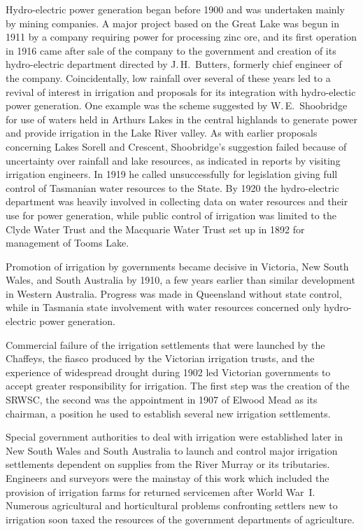 Hydro-electric power generation began before 1900 and was undertaken
mainly by mining companies.  A major project based on the Great Lake
 was begun in 1911 by a company requiring power for
processing zinc ore, and its first operation in 1916 came after sale
of the company to the government and creation of its hydro-electric
department directed by J.\,H.~Butters,  formerly
chief engineer of the company.  Coincidentally, low rainfall over
several of these years led to a revival of interest in irrigation and
proposals for its integration with hydro-electic power generation.
One example was the scheme suggested by W.\,E.~Shoobridge
 for use of
waters held in Arthurs Lakes  in the central
highlands to generate power and provide irrigation in the Lake River
valley.  As with earlier proposals concerning Lakes Sorell and
Crescent, Shoobridge's suggestion failed because of uncertainty over
rainfall and lake resources, as indicated in reports by visiting
irrigation engineers. In 1919 he called unsuccessfully for legislation
giving full control of Tasmanian water resources to the State.  By
1920 the hydro-electric department was heavily involved in collecting
data on water resources and their use for power generation, while
public control of irrigation was limited to the Clyde Water Trust and
the Macquarie Water Trust  set up in 1892
for management of  Tooms
Lake.


\closure
Promotion of irrigation by governments became decisive in Victoria,
New South Wales, and South Australia by 1910, a few years earlier than
similar development in Western Australia.  Progress was made in
Queensland without state control, while in Tasmania state involvement
with water resources concerned only hydro-electric power generation.

Commercial failure of the irrigation settlements that were launched by
the Chaffeys, the fiasco produced by the Victorian irrigation trusts,
and the experience of widespread drought during 1902 led Victorian
governments to accept greater responsibility for irrigation.  The
first step was the creation of the SRWSC, the second was the
appointment in 1907 of Elwood Mead as its chairman, a position he used
to establish several new irrigation settlements.

Special government authorities to deal with irrigation were
established later in New South Wales and South Australia to launch and
control major irrigation settlements dependent on supplies from the
River Murray or its tributaries.  Engineers and surveyors were the
mainstay of this work which included the provision of irrigation farms
for returned servicemen after World War~I.  Numerous agricultural and
horticultural problems confronting settlers new to irrigation soon
taxed the resources of the government departments of agriculture.

